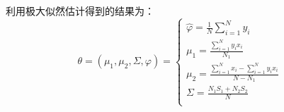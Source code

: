 \documentclass[a4paper]{article}
\begin{document}
利用极大似然估计得到的结果为：
\begin{equation}
    \theta = (\mu_1,\mu_2,\Sigma,\varphi)=
    \left\{
        \begin{array}{ll}
            \hat{\varphi} = \frac{1}{N} \sum_{i=1}^N y_i & \\
            \mu_1 = \frac{\sum_{i=1}^N y_i x_i}{N_1} & \\
            \mu_2 = \frac{\sum_{i=1}^N x_i - \sum_{i=1}^N y_ix_i}{N - N_1} & \\
            \Sigma = \frac{N_1S_1 + N_2S_2}{N} & \\
        \end{array}
    \right.
\end{equation}
\end{document}
